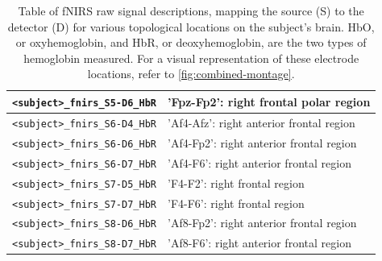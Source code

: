 \begin{table}
\begin{tabularx}{\textwidth}{|l|X|}
    \hline
    \texttt{<subject>\_fnirs\_S5-D6\_HbR} & 'Fpz-Fp2': right frontal polar region  \\
    \hline
    \texttt{<subject>\_fnirs\_S6-D4\_HbR} & 'Af4-Afz': right anterior frontal region  \\
    \hline
    \texttt{<subject>\_fnirs\_S6-D6\_HbR} & 'Af4-Fp2': right anterior frontal region  \\
    \hline
    \texttt{<subject>\_fnirs\_S6-D7\_HbR} & 'Af4-F6': right anterior frontal region  \\
    \hline
    \texttt{<subject>\_fnirs\_S7-D5\_HbR} & 'F4-F2': right frontal region  \\
    \hline
    \texttt{<subject>\_fnirs\_S7-D7\_HbR} & 'F4-F6': right frontal region  \\
    \hline
    \texttt{<subject>\_fnirs\_S8-D6\_HbR} & 'Af8-Fp2': right anterior frontal region  \\
    \hline
    \texttt{<subject>\_fnirs\_S8-D7\_HbR} & 'Af8-F6': right anterior frontal region  \\
    \hline
    \end{tabularx}
    \caption{Table of fNIRS raw signal descriptions, mapping the source (S) to the detector (D) for various topological locations on the subject's brain. HbO, or oxyhemoglobin, and HbR, or deoxyhemoglobin, are the two types of hemoglobin measured. For a visual representation of these electrode locations, refer to \autoref{fig:combined-montage}.}
    \label{tab:fNIRS_signals}
    \end{table}
